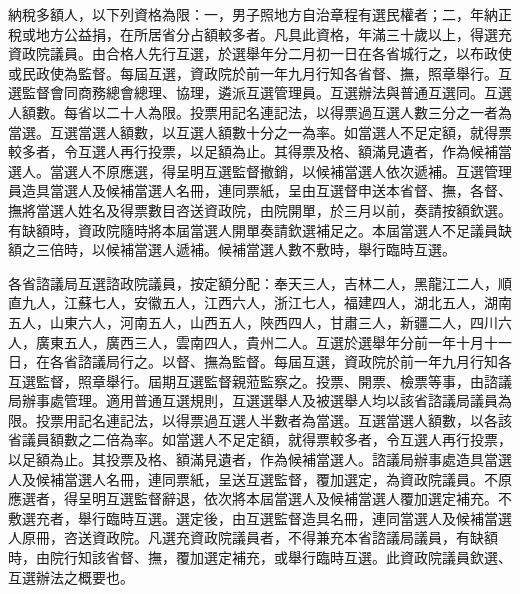 \begin{pinyinscope}
納稅多額人，以下列資格為限：一，男子照地方自治章程有選民權者；二，年納正稅或地方公益捐，在所居省分占額較多者。凡具此資格，年滿三十歲以上，得選充資政院議員。由合格人先行互選，於選舉年分二月初一日在各省城行之，以布政使或民政使為監督。每屆互選，資政院於前一年九月行知各省督、撫，照章舉行。互選監督會同商務總會總理、協理，遴派互選管理員。互選辦法與普通互選同。互選人額數。每省以二十人為限。投票用記名連記法，以得票過互選人數三分之一者為當選。互選當選人額數，以互選人額數十分之一為率。如當選人不足定額，就得票較多者，令互選人再行投票，以足額為止。其得票及格、額滿見遺者，作為候補當選人。當選人不原應選，得呈明互選監督撤銷，以候補當選人依次遞補。互選管理員造具當選人及候補當選人名冊，連同票紙，呈由互選督申送本省督、撫，各督、撫將當選人姓名及得票數目咨送資政院，由院開單，於三月以前，奏請按額欽選。有缺額時，資政院隨時將本屆當選人開單奏請欽選補足之。本屆當選人不足議員缺額之三倍時，以候補當選人遞補。候補當選人數不敷時，舉行臨時互選。

各省諮議局互選諮政院議員，按定額分配：奉天三人，吉林二人，黑龍江二人，順直九人，江蘇七人，安徽五人，江西六人，浙江七人，福建四人，湖北五人，湖南五人，山東六人，河南五人，山西五人，陜西四人，甘肅三人，新疆二人，四川六人，廣東五人，廣西三人，雲南四人，貴州二人。互選於選舉年分前一年十月十一日，在各省諮議局行之。以督、撫為監督。每屆互選，資政院於前一年九月行知各互選監督，照章舉行。屆期互選監督親蒞監察之。投票、開票、檢票等事，由諮議局辦事處管理。適用普通互選規則，互選選舉人及被選舉人均以該省諮議局議員為限。投票用記名連記法，以得票過互選人半數者為當選。互選當選人額數，以各該省議員額數之二倍為率。如當選人不足定額，就得票較多者，令互選人再行投票，以足額為止。其投票及格、額滿見遺者，作為候補當選人。諮議局辦事處造具當選人及候補當選人名冊，連同票紙，呈送互選監督，覆加選定，為資政院議員。不原應選者，得呈明互選監督辭退，依次將本屆當選人及候補當選人覆加選定補充。不敷選充者，舉行臨時互選。選定後，由互選監督造具名冊，連同當選人及候補當選人原冊，咨送資政院。凡選充資政院議員者，不得兼充本省諮議局議員，有缺額時，由院行知該省督、撫，覆加選定補充，或舉行臨時互選。此資政院議員欽選、互選辦法之概要也。


\end{pinyinscope}
